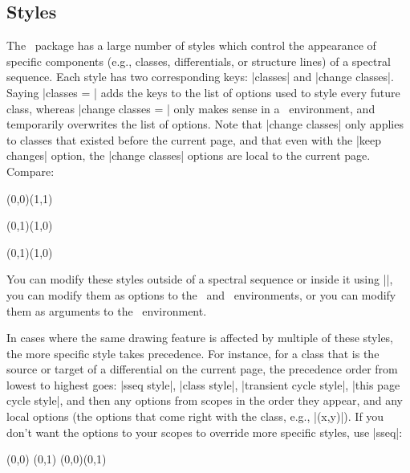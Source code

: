 \begin{sseqdata}[name = basic, cohomological Serre grading]
\section{Styles}
The \sseqpages\  package has a large number of styles which control the appearance of specific components (e.g., classes, differentials, or structure lines) of a spectral sequence. Each style has two corresponding keys: |classes| and |change classes|.  Saying |classes = | adds the keys to the list of options used to style every future class, whereas |change classes = | only makes sense in a \sseqpageenv\  environment, and temporarily overwrites the list of options. Note that |change classes| only applies to classes that existed before the current page, and that even with the |keep changes| option, the |change classes| options are local to the current page. Compare:
\begin{codeexample}[width = 8cm]
\begin{sseqdata}[ name = style example ]
\class(0,0)\class(1,1)
\end{sseqdata}
\begin{sseqpage}[ name = style example,
                  classes = { fill, blue },
                  title = change new classes ]
\class(0,1)\class(1,0)
\end{sseqpage}
\quad
\begin{sseqpage}[ name = style example,
                  change classes = { fill, blue },
                  title = change old classes ]
\class(0,1)\class(1,0)
\end{sseqpage}
\end{codeexample}

You can modify these styles outside of a spectral sequence or inside it using |\sseqset|, you can modify them as options to the \sseqdataenv\  and \sseqpageenv\  environments, or you can modify them as arguments to the \scopeenv\  environment.

In cases where the same drawing feature is affected by multiple of these styles, the more specific style takes precedence. For instance, for a class that is the source or target of a differential on the current page, the precedence order from lowest to highest goes: |sseq style|, |class style|, |transient cycle style|, |this page cycle style|, and then any options from scopes in the order they appear, and any local options (the options that come right with the class, e.g., |(x,y)|). If you don't want the options to your scopes to override more specific styles, use |sseq|:
\begin{codeexample}[width = 7cm]
\begin{sseqpage}[ classes = { blue, fill },
   title style = { align = center, text width = 2.4cm },
   title = { everything is orange } ]
\begin{scope}[orange]
\class(0,0) \class(0,1)
\structline(0,0)(0,1)
\end{scope}
\end{sseqpage}


\end{codeexample}
\end{sseqdata}
